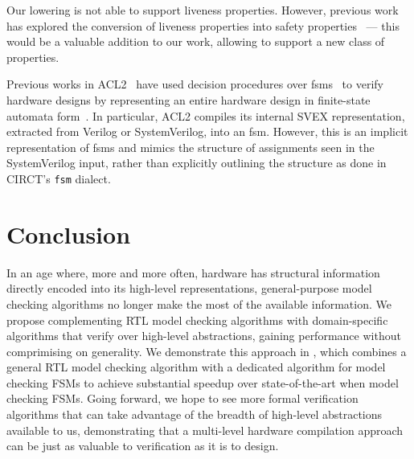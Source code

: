 \documentclass[acmsmall,screen,review]{acmart}
\begin{document}
Our lowering is not able to support liveness properties.
However, previous work has explored the conversion of liveness properties into safety properties~\cite{biere2002liveness, padon2017liveness} --- this would be a valuable addition to our work, allowing \toolname{} to support a new class of properties.

Previous works in ACL2~\cite{kaufmann1996acl2} have used decision procedures over \acp{fsm}~\cite{hunt2006sat} to verify hardware designs by representing an entire hardware design in finite-state automata form~\cite{hunt2017industrial}.
In particular, ACL2 compiles its internal SVEX representation, extracted from Verilog or SystemVerilog, into an \ac{fsm}.
However, this is an implicit representation of \acp{fsm} and mimics the structure of assignments seen in the SystemVerilog input, rather than explicitly outlining the structure as done in CIRCT's \texttt{fsm} dialect.


\section{Conclusion}
In an age where, more and more often, hardware has structural information directly encoded into its high-level representations, general-purpose model checking algorithms no longer make the most of the available information.
We propose complementing RTL model checking algorithms with domain-specific algorithms that verify over high-level abstractions, gaining performance without comprimising on generality.
We demonstrate this approach in \toolname{}, which combines a general RTL model checking algorithm with a dedicated algorithm for model checking FSMs to achieve substantial speedup over state-of-the-art when model checking FSMs.
Going forward, we hope to see more formal verification algorithms that can take advantage of the breadth of high-level abstractions available to us, demonstrating that a multi-level hardware compilation approach can be just as valuable to verification as it is to design.
\newpage
\end{document}
